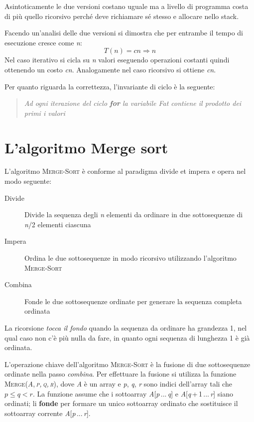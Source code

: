 \documentclass[10pt, a4paper]{report}
\begin{document}
Asintoticamente le due versioni costano uguale ma a livello di programma costa di più quello ricorsivo perché deve richiamare sé stesso e allocare nello stack.

Facendo un'analisi delle due versioni si dimostra che per entrambe il tempo di esecuzione cresce come \textit{n}:
\begin{equation*}
T(n) = cn\Rightarrow n
\end{equation*}
Nel caso iterativo si cicla su \textit{n} valori eseguendo operazioni costanti quindi ottenendo un costo \textit{cn}. Analogamente nel caso ricorsivo si ottiene \textit{cn}.

Per quanto riguarda la correttezza, l'invariante di ciclo è la seguente:
\begin{quote}
\textit{Ad ogni iterazione del ciclo \textbf{for} la variabile \textit{Fat} contiene il prodotto dei primi i valori}
\end{quote}
\section{L'algoritmo Merge sort}
L'algoritmo \textsc{Merge-Sort} è conforme al paradigma divide et impera e opera nel modo seguente:
\begin{description}
\item[Divide]Divide la sequenza degli \textit{n} elementi da ordinare in due sottosequenze di \textit{n}/2 elementi ciascuna
\item[Impera]Ordina le due sottosequenze in modo ricorsivo utilizzando l'algoritmo \textsc{Merge-Sort}
\item[Combina]Fonde le due sottosequenze ordinate per generare la sequenza completa ordinata
\end{description}
La ricorsione \textsl{tocca il fondo} quando la sequenza da ordinare ha grandezza 1, nel qual caso non c'è più nulla da fare, in quanto ogni sequenza di lunghezza 1 è già ordinata.

L'operazione chiave dell'algoritmo \textsc{Merge-Sort} è la fusione di due sottosequenze ordinate nella passo \textsl{combina}. Per effettuare la fusione si utilizza la funzione	\textsc{Merge(\textit{A},\textit{\,p,\,q,\,r})}, dove \textit{A} è un array e \textit{p}, \textit{q}, \textit{r} sono indici dell'array tali che $p \leq q < r$. La funzione assume che i sottoarray \textit{A}[\textit{p}\,...\,\textit{q}] e \textit{A}[\textit{q}\,+\,1\,...\,\textit{r}] siano ordinati; li \textbf{fonde} per formare un unico sottoarray  ordinato che sostituisce il sottoarray corrente \textit{A}[\textit{p}\,...\,\textit{r}].
\end{document}
